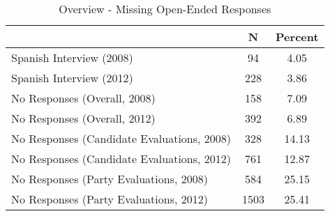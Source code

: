 \begin{table}[ht]
\centering
\begin{tabular}{lcc}
  \hline
 & N & Percent \\ 
  \hline
Spanish Interview (2008) & 94 & 4.05 \\ 
  Spanish Interview (2012) & 228 & 3.86 \\ 
  No Responses (Overall, 2008) & 158 & 7.09 \\ 
  No Responses (Overall, 2012) & 392 & 6.89 \\ 
  No Responses (Candidate Evaluations, 2008) & 328 & 14.13 \\ 
  No Responses (Candidate Evaluations, 2012) & 761 & 12.87 \\ 
  No Responses (Party Evaluations, 2008) & 584 & 25.15 \\ 
  No Responses (Party Evaluations, 2012) & 1503 & 25.41 \\ 
   \hline
\end{tabular}
\caption{Overview - Missing Open-Ended Responses} 
\label{tab:a1_mis}
\end{table}
